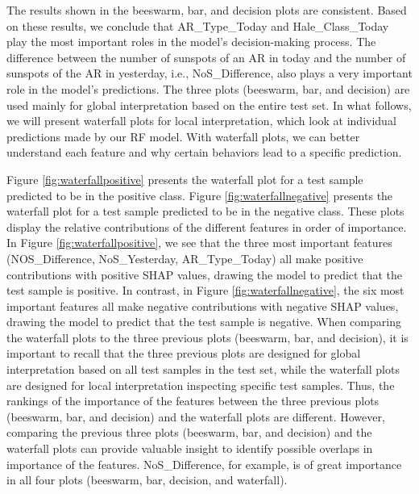 \documentclass[draft]{agujournal2019}
\begin{document}
The results shown in the beeswarm, bar, and decision
plots are consistent. Based on these results, we conclude
that AR\_Type\_Today and Hale\_Class\_Today play the most 
important roles in the model's decision-making process.
The difference between the number of sunspots of an AR in today and
the number of sunspots of the AR in yesterday, i.e.,
NoS\_Difference, also plays a very important role in the 
model’s predictions.
The three plots (beeswarm, bar, and decision) are used mainly for global interpretation based on the entire test set.
In what follows, we will present waterfall plots for local interpretation,
which look at individual predictions made by
our RF model. With waterfall plots, we can better understand
each feature and why certain behaviors lead to a specific
prediction.

Figure \ref{fig:waterfallpositive} presents the waterfall plot for a test sample predicted
to be in the positive class. 
Figure \ref{fig:waterfallnegative} presents the
waterfall plot for a test sample predicted
to be in the negative class. 
These plots
display the relative contributions of the different features in
order of importance.
In Figure \ref{fig:waterfallpositive}, we see that the three most important features\\
(NOS\_Difference, 
NoS\_Yesterday,
AR\_Type\_Today)
all make positive contributions
with positive SHAP values, 
drawing the model to predict that the test sample is positive.
In contrast, in Figure \ref{fig:waterfallnegative},
the six most important features all make negative contributions with negative SHAP values, drawing the model to predict that the test sample is negative.
When comparing the waterfall plots to the three previous plots (beeswarm, bar, and decision), it
is important to recall that the three previous plots are designed for global interpretation
based on all test samples in the test set, while
the waterfall plots are designed for local interpretation inspecting specific
test samples. 
Thus, the rankings of the importance of the features between the
three previous plots
(beeswarm, bar, and decision)
and the waterfall plots are different.
However, comparing the previous three plots
(beeswarm, bar, and decision)
and
the waterfall plots can provide
valuable insight to identify possible overlaps in importance
of the features. 
NoS\_Difference, for example, is of great importance
in all four plots
(beeswarm, bar, decision, and waterfall).
\end{document}
